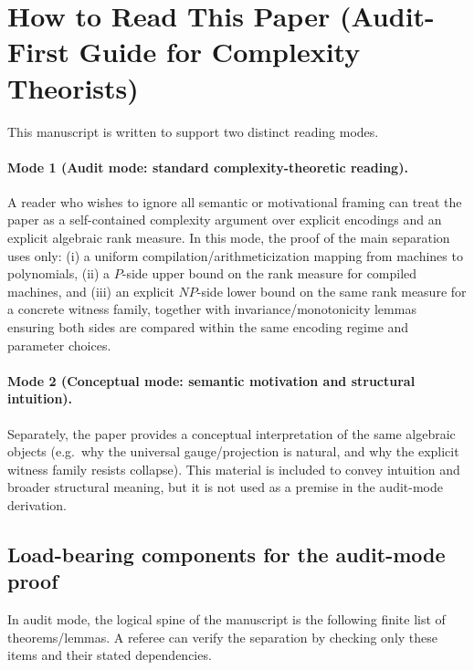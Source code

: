 \documentclass[12pt]{article}
\theoremstyle{definition}
\theoremstyle{definition}
\theoremstyle{remark}
\theoremstyle{remark}
\begin{document}

\section{How to Read This Paper (Audit-First Guide for Complexity Theorists)}
\label{sec:how-to-read}

This manuscript is written to support two distinct reading modes.

\paragraph{Mode 1 (Audit mode: standard complexity-theoretic reading).}
A reader who wishes to ignore all semantic or motivational framing can treat the paper as a
self-contained complexity argument over explicit encodings and an explicit algebraic rank
measure.  In this mode, the proof of the main separation uses only:
(i) a uniform compilation/arithmeticization mapping from machines to polynomials,
(ii) a $P$-side upper bound on the rank measure for compiled machines, and
(iii) an explicit $NP$-side lower bound on the same rank measure for a concrete witness family,
together with invariance/monotonicity lemmas ensuring both sides are compared within the
same encoding regime and parameter choices.

\paragraph{Mode 2 (Conceptual mode: semantic motivation and structural intuition).}
Separately, the paper provides a conceptual interpretation of the same algebraic objects
(e.g.\ why the universal gauge/projection is natural, and why the explicit witness family
resists collapse).  This material is included to convey intuition and broader structural
meaning, but it is not used as a premise in the audit-mode derivation.

\subsection{Load-bearing components for the audit-mode proof}
\label{subsec:load-bearing-vs-expository}

In audit mode, the logical spine of the manuscript is the following finite list of
theorems/lemmas.  A referee can verify the separation by checking only these items and
their stated dependencies.
\end{document}
